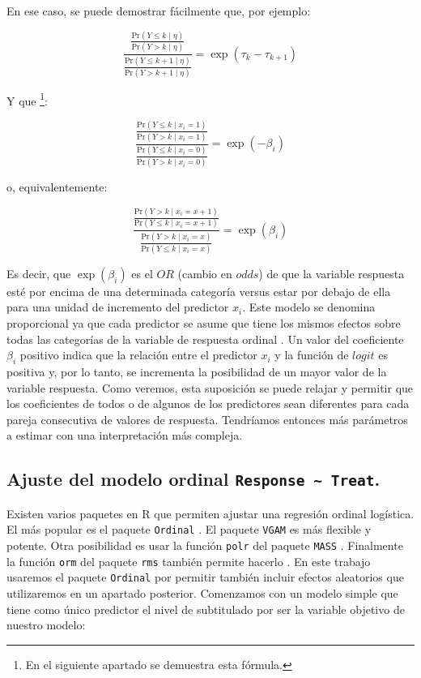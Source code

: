 \documentclass[
  12pt,
  a4paper,
  extrafontsizes,
  onecolumn,
  openright]{memoir}
\begin{document}
En ese caso, se puede demostrar fácilmente que, por ejemplo:

\[\frac{\frac{\mathrm{Pr}(Y \leq k \mid \eta)}{\mathrm{Pr}(Y > k \mid \eta)}}{\frac{\mathrm{Pr}(Y \leq k+1 \mid \eta)}{\mathrm{Pr}(Y > k+1 \mid \eta)}} = \exp(\tau_{k} - \tau_{k+1})\]

Y que \footnote{En el siguiente apartado se demuestra esta fórmula.}:

\[\frac{\frac{\mathrm{Pr}(Y \leq k \mid x_i = 1)}{\mathrm{Pr}(Y > k \mid x_i = 1)}}{\frac{\mathrm{Pr}(Y \leq k \mid x_i=0)}{\mathrm{Pr}(Y > k \mid x_i = 0)}} = \exp(-\beta_{i})\]

o, equivalentemente:

\[\frac{\frac{\mathrm{Pr}(Y > k \mid x_i = x + 1)}{\mathrm{Pr}(Y \leq k \mid x_i = x + 1)}}{\frac{\mathrm{Pr}(Y > k \mid x_i = x)}{\mathrm{Pr}(Y \leq k \mid x_i = x)}} = \exp(\beta_{i})\]

Es decir, que \(\exp(\beta_{i})\) es el \(OR\) (cambio en \(odds\)) de
que la variable respuesta esté por encima de una determinada categoría
versus estar por debajo de ella para una unidad de incremento del
predictor \(x_i\). Este modelo se denomina proporcional ya que cada
predictor se asume que tiene los mismos efectos sobre todas las
categorías de la variable de respuesta ordinal
\autocite[ver][]{Liu2202}. Un valor del coeficiente \(\beta_i\) positivo
indica que la relación entre el predictor \(x_i\) y la función de
\(logit\) es positiva y, por lo tanto, se incrementa la posibilidad de
un mayor valor de la variable respuesta. Como veremos, esta suposición
se puede relajar y permitir que los coeficientes de todos o de algunos
de los predictores sean diferentes para cada pareja consecutiva de
valores de respuesta. Tendríamos entonces más parámetros a estimar con
una interpretación más compleja.

\hypertarget{ajuste-del-modelo-ordinal-response-treat.}{%
\subsection{\texorpdfstring{Ajuste del modelo ordinal
\texttt{Response\ \textasciitilde{}\ Treat}.}{Ajuste del modelo ordinal Response \textasciitilde{} Treat.}}\label{ajuste-del-modelo-ordinal-response-treat.}}

Existen varios paquetes en R que permiten ajustar una regresión ordinal
logística. El más popular es el paquete \texttt{Ordinal}
\autocite{ordinalR}. El paquete \texttt{VGAM} \autocite{VGAMR} es más
flexible y potente. Otra posibilidad es usar la función \texttt{polr}
del paquete \texttt{MASS} \autocite{MASSR}. Finalmente la función
\texttt{orm} del paquete \texttt{rms} también permite hacerlo
\autocite[ver][]{harrell2015}. En este trabajo usaremos el paquete
\texttt{Ordinal} por permitir también incluir efectos aleatorios que
utilizaremos en un apartado posterior. Comenzamos con un modelo simple
que tiene como único predictor el nivel de subtitulado por ser la
variable objetivo de nuestro modelo:
\end{document}

